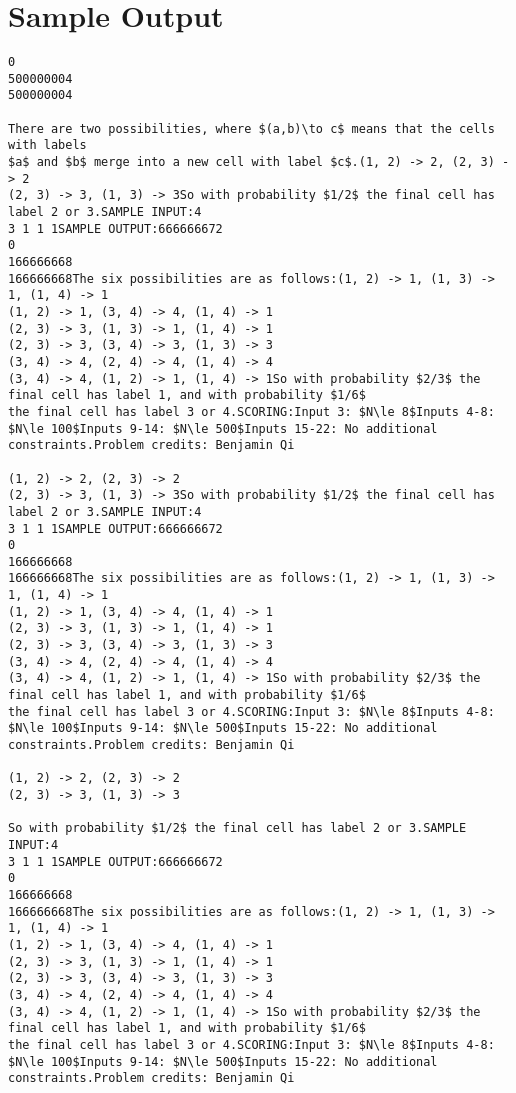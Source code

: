 \documentclass[12pt]{article}
\begin{document}
\section*{Sample Output}
\begin{verbatim}
0
500000004
500000004

There are two possibilities, where $(a,b)\to c$ means that the cells with labels
$a$ and $b$ merge into a new cell with label $c$.(1, 2) -> 2, (2, 3) -> 2
(2, 3) -> 3, (1, 3) -> 3So with probability $1/2$ the final cell has label 2 or 3.SAMPLE INPUT:4
3 1 1 1SAMPLE OUTPUT:666666672
0
166666668
166666668The six possibilities are as follows:(1, 2) -> 1, (1, 3) -> 1, (1, 4) -> 1
(1, 2) -> 1, (3, 4) -> 4, (1, 4) -> 1
(2, 3) -> 3, (1, 3) -> 1, (1, 4) -> 1
(2, 3) -> 3, (3, 4) -> 3, (1, 3) -> 3
(3, 4) -> 4, (2, 4) -> 4, (1, 4) -> 4
(3, 4) -> 4, (1, 2) -> 1, (1, 4) -> 1So with probability $2/3$ the final cell has label 1, and with probability $1/6$
the final cell has label 3 or 4.SCORING:Input 3: $N\le 8$Inputs 4-8: $N\le 100$Inputs 9-14: $N\le 500$Inputs 15-22: No additional constraints.Problem credits: Benjamin Qi

(1, 2) -> 2, (2, 3) -> 2
(2, 3) -> 3, (1, 3) -> 3So with probability $1/2$ the final cell has label 2 or 3.SAMPLE INPUT:4
3 1 1 1SAMPLE OUTPUT:666666672
0
166666668
166666668The six possibilities are as follows:(1, 2) -> 1, (1, 3) -> 1, (1, 4) -> 1
(1, 2) -> 1, (3, 4) -> 4, (1, 4) -> 1
(2, 3) -> 3, (1, 3) -> 1, (1, 4) -> 1
(2, 3) -> 3, (3, 4) -> 3, (1, 3) -> 3
(3, 4) -> 4, (2, 4) -> 4, (1, 4) -> 4
(3, 4) -> 4, (1, 2) -> 1, (1, 4) -> 1So with probability $2/3$ the final cell has label 1, and with probability $1/6$
the final cell has label 3 or 4.SCORING:Input 3: $N\le 8$Inputs 4-8: $N\le 100$Inputs 9-14: $N\le 500$Inputs 15-22: No additional constraints.Problem credits: Benjamin Qi

(1, 2) -> 2, (2, 3) -> 2
(2, 3) -> 3, (1, 3) -> 3

So with probability $1/2$ the final cell has label 2 or 3.SAMPLE INPUT:4
3 1 1 1SAMPLE OUTPUT:666666672
0
166666668
166666668The six possibilities are as follows:(1, 2) -> 1, (1, 3) -> 1, (1, 4) -> 1
(1, 2) -> 1, (3, 4) -> 4, (1, 4) -> 1
(2, 3) -> 3, (1, 3) -> 1, (1, 4) -> 1
(2, 3) -> 3, (3, 4) -> 3, (1, 3) -> 3
(3, 4) -> 4, (2, 4) -> 4, (1, 4) -> 4
(3, 4) -> 4, (1, 2) -> 1, (1, 4) -> 1So with probability $2/3$ the final cell has label 1, and with probability $1/6$
the final cell has label 3 or 4.SCORING:Input 3: $N\le 8$Inputs 4-8: $N\le 100$Inputs 9-14: $N\le 500$Inputs 15-22: No additional constraints.Problem credits: Benjamin Qi


\end{verbatim}
\end{document}
